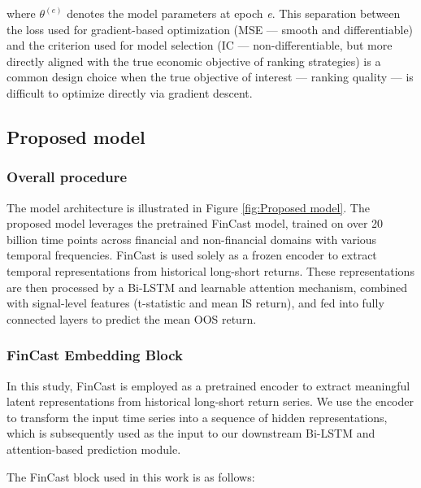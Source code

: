 \documentclass[pdflatex,sn-mathphys-num]{sn-jnl}%
\theoremstyle{thmstyleone}%
\theoremstyle{thmstyletwo}%
\theoremstyle{thmstylethree}%
\begin{document}
where $\theta^{(e)}$ denotes the model parameters at epoch \textit{e}. This separation between the loss used for gradient-based optimization (MSE — smooth and differentiable) and the criterion used for model selection (IC — non-differentiable, but more directly aligned with the true economic objective of ranking strategies) is a common design choice when the true objective of interest — ranking quality — is difficult to optimize directly via gradient descent.

\subsection{Proposed model}\label{subsec3}
\subsubsection{Overall procedure}\label{subsubModel1}
The model architecture is illustrated in Figure \ref{fig:Proposed model}. The proposed model leverages the pretrained FinCast model, trained on over 20 billion time points across financial and non-financial domains with various temporal frequencies. FinCast is used solely as a frozen encoder to extract temporal representations from historical long-short returns. These representations are then processed by a Bi-LSTM and learnable attention mechanism, combined with signal-level features (t-statistic and mean IS return), and fed into fully connected layers to predict the mean OOS return.
\subsubsection{FinCast Embedding Block}\label{subsubModel2}
In this study, FinCast is employed as a pretrained encoder to extract meaningful latent representations from historical long-short return series. We use the encoder to transform the input time series into a sequence of hidden representations, which is subsequently used as the input to our downstream Bi-LSTM and attention-based prediction module.

The FinCast block used in this work is as follows:
\end{document}
